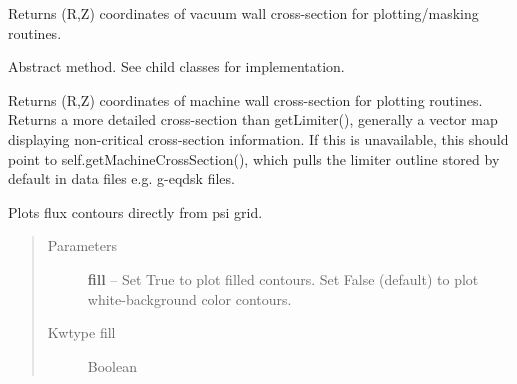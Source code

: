 \documentclass[letterpaper,10pt,english]{sphinxmanual}
\begin{document}
\begin{fulllineitems}
\begin{fulllineitems}
Returns (R,Z) coordinates of vacuum wall cross-section for plotting/masking routines.

\end{fulllineitems}


\begin{fulllineitems}
\label{eqtools:eqtools.core.Equilibrium.getMachineCrossSectionFull}
Abstract method.  See child classes for implementation.

Returns (R,Z) coordinates of machine wall cross-section for plotting routines.
Returns a more detailed cross-section than getLimiter(), generally a vector map
displaying non-critical cross-section information.  If this is unavailable, this
should point to self.getMachineCrossSection(), which pulls the limiter outline
stored by default in data files e.g. g-eqdsk files.

\end{fulllineitems}


\begin{fulllineitems}
\label{eqtools:eqtools.core.Equilibrium.gfile}
\end{fulllineitems}


\begin{fulllineitems}
\label{eqtools:eqtools.core.Equilibrium.plotFlux}
Plots flux contours directly from psi grid.
\begin{quote}\begin{description}
\item[{Parameters}] \leavevmode
\textbf{fill} -- Set True to plot filled contours.  Set False (default) to plot white-background
color contours.

\item[{Kwtype fill}] \leavevmode
Boolean

\end{description}\end{quote}

\end{fulllineitems}


\end{fulllineitems}
\end{document}
